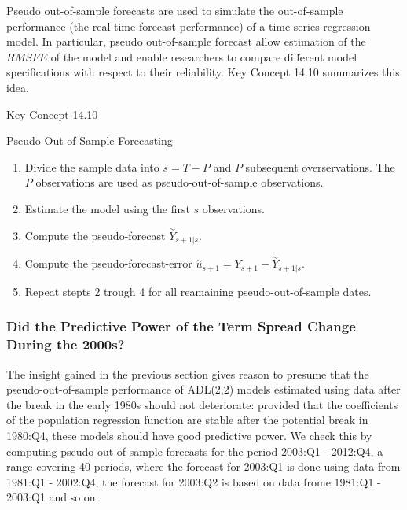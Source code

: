 \documentclass[]{book}
\theoremstyle{definition}
\theoremstyle{definition}
\theoremstyle{definition}
\theoremstyle{remark}
\begin{document}
Pseudo out-of-sample forecasts are used to simulate the out-of-sample
performance (the real time forecast performance) of a time series
regression model. In particular, pseudo out-of-sample forecast allow
estimation of the \(RMSFE\) of the model and enable researchers to
compare different model specifications with respect to their
reliability. Key Concept 14.10 summarizes this idea.

Key Concept 14.10

Pseudo Out-of-Sample Forecasting

\begin{enumerate}
\def\labelenumi{\arabic{enumi}.}
\item
  Divide the sample data into \(s=T-P\) and \(P\) subsequent
  overservations. The \(P\) observations are used as
  pseudo-out-of-sample observations.
\item
  Estimate the model using the first \(s\) observations.
\item
  Compute the pseudo-forecast \(\overset{\sim}{Y}_{s+1\vert s}\).
\item
  Compute the pseudo-forecast-error
  \(\overset{\sim}{u}_{s+1} = Y_{s+1} - \overset{\sim}{Y}_{s+1\vert s}\).
\item
  Repeat stepts 2 trough 4 for all reamaining pseudo-out-of-sample
  dates.
\end{enumerate}

\subsubsection*{Did the Predictive Power of the Term Spread Change
During the
2000s?}\label{did-the-predictive-power-of-the-term-spread-change-during-the-2000s}

The insight gained in the previous section gives reason to presume that
the pseudo-out-of-sample performance of ADL(\(2\),\(2\)) models
estimated using data after the break in the early 1980s should not
deteriorate: provided that the coefficients of the population regression
function are stable after the potential break in 1980:Q4, these models
should have good predictive power. We check this by computing
pseudo-out-of-sample forecasts for the period 2003:Q1 - 2012:Q4, a range
covering 40 periods, where the forecast for 2003:Q1 is done using data
from 1981:Q1 - 2002:Q4, the forecast for 2003:Q2 is based on data frome
1981:Q1 - 2003:Q1 and so on.
\end{document}
